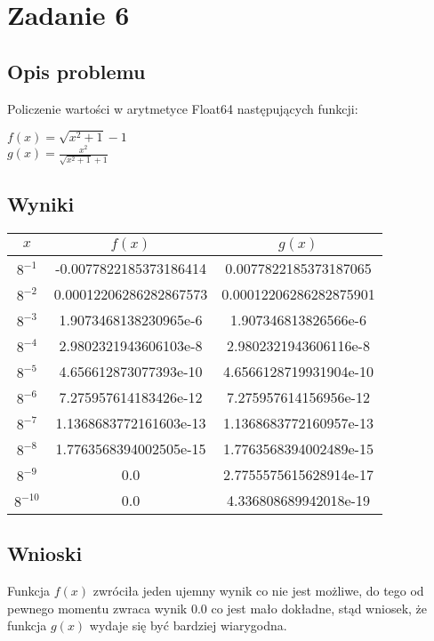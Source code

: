\documentclass{article}
\begin{document}
\section{Zadanie 6}
\subsection{Opis problemu}
    Policzenie wartości w arytmetyce Float64 następujących funkcji:\\
    \begin{center}
        $f(x)=\sqrt{x^2 + 1} - 1$\\ $g(x)=\frac{x^2}{\sqrt{x^2 +1}+1}$
    \end{center}
\subsection{Wyniki}
        \begin{center}
        \begin{tabular}{|c||c|c|}
        \hline
            $x$ & $f(x)$ & $g(x)$ \\
            \hline\hline
            $8^{-1}$ & -0.0077822185373186414 & 0.0077822185373187065 \\
            \hline
            $8^{-2}$ & 0.00012206286282867573 & 0.00012206286282875901\\
            \hline
            $8^{-3}$ & 1.9073468138230965e-6 & 1.907346813826566e-6\\
            \hline
            $8^{-4}$ & 2.9802321943606103e-8 & 2.9802321943606116e-8\\
            \hline
            $8^{-5}$ & 4.656612873077393e-10 & 4.6566128719931904e-10\\
            \hline
            $8^{-6}$ & 7.275957614183426e-12 & 7.275957614156956e-12\\
            \hline
            $8^{-7}$ & 1.1368683772161603e-13 & 1.1368683772160957e-13\\
            \hline
            $8^{-8}$ & 1.7763568394002505e-15 & 1.7763568394002489e-15\\
            \hline
            $8^{-9}$ & 0.0 & 2.7755575615628914e-17\\
            \hline
            $8^{-10}$ & 0.0 & 4.336808689942018e-19\\
        \hline
        \end{tabular}
    \end{center}
\subsection{Wnioski}
    Funkcja $f(x)$ zwróciła jeden ujemny wynik co nie jest możliwe, do tego od pewnego momentu zwraca wynik 0.0 co jest mało dokładne, stąd wniosek, że funkcja $g(x)$ wydaje się być bardziej wiarygodna.
\end{document}
